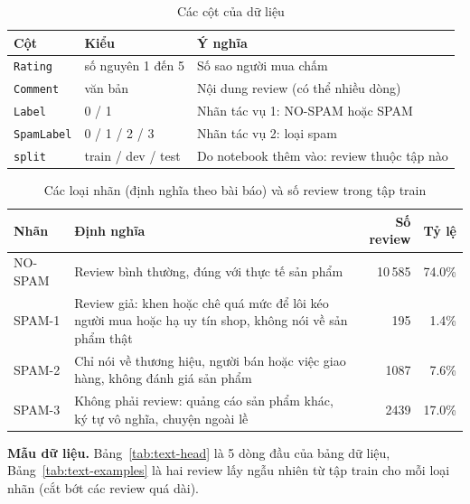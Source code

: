 \begin{table}[H]
\centering
\caption{Các cột của dữ liệu}
\label{tab:text-columns}
\begin{tabular}{lll}
\toprule
Cột & Kiểu & Ý nghĩa\\
\midrule
\texttt{Rating} & số nguyên 1 đến 5 & Số sao người mua chấm\\
\texttt{Comment} & văn bản & Nội dung review (có thể nhiều dòng)\\
\texttt{Label} & 0 / 1 & Nhãn tác vụ 1: NO-SPAM hoặc SPAM\\
\texttt{SpamLabel} & 0 / 1 / 2 / 3 & Nhãn tác vụ 2: loại spam\\
\texttt{split} & train / dev / test & Do notebook thêm vào: review thuộc tập nào\\
\bottomrule
\end{tabular}
\end{table}

\begin{table}[H]
\centering
\caption{Các loại nhãn (định nghĩa theo bài báo) và số review trong tập train}
\label{tab:text-labels}
\begin{tabular}{>{\raggedright\arraybackslash}p{2.4cm}>{\raggedright\arraybackslash}p{8.4cm}rr}
\toprule
Nhãn & Định nghĩa & Số review & Tỷ lệ\\
\midrule
NO-SPAM & Review bình thường, đúng với thực tế sản phẩm & 10\,585 & 74.0\%\\
SPAM-1 & Review giả: khen hoặc chê quá mức để lôi kéo người mua hoặc hạ uy tín shop, không nói về sản phẩm thật & 195 & 1.4\%\\
SPAM-2 & Chỉ nói về thương hiệu, người bán hoặc việc giao hàng, không đánh giá sản phẩm & 1087 & 7.6\%\\
SPAM-3 & Không phải review: quảng cáo sản phẩm khác, ký tự vô nghĩa, chuyện ngoài lề & 2439 & 17.0\%\\
\bottomrule
\end{tabular}
\end{table}

\textbf{Mẫu dữ liệu.} Bảng~\ref{tab:text-head} là 5 dòng đầu của bảng dữ liệu, Bảng~\ref{tab:text-examples} là hai review
lấy ngẫu nhiên từ tập train cho mỗi loại nhãn (cắt bớt các review quá dài).

